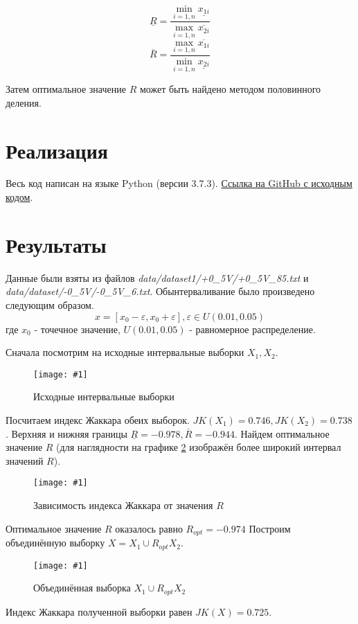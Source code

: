 \documentclass[a4paper,12pt]{article}
\newcommand{\plot}[3]{
    \begin{figure}[H]
        \begin{center}
            \texttt{[image: \#1]}
            \caption{#2}
            \label{#3}
        \end{center}
    \end{figure}
}
\begin{document}
    \begin{equation}
        \underline{R} = \frac{\min_{i=1,n}\underline{x_{1i}}}{\max_{i=1,n}\overline{x_{2i}}}
    \end{equation}
    \begin{equation}
        \overline{R} = \frac{\max_{i=1,n}\overline{x_{1i}}}{\min_{i=1,n}\underline{x_{2i}}}
    \end{equation}

    Затем оптимальное значение $ R $ может быть найдено методом половинного деления.

    \section{Реализация}
    \quad Весь код написан на языке Python (версии 3.7.3).
    \href{https://github.com/kirillkuks/Intervals/tree/master/lab1}{Ссылка на GitHub с исходным кодом}.

    \section{Результаты}
    \quad Данные были взяты из файлов \textsl{data/dataset1/+0\_5V/+0\_5V\_85.txt} и \textsl{data/dataset/-0\_5V/-0\_5V\_6.txt}.
    Обынтерваливание было произведено следующим образом.
    \begin{equation}
        x = [x_0 - \varepsilon, x_0 + \varepsilon], \varepsilon \in U(0.01, 0.05)
    \end{equation}
    где $ x_0 $ - точечное значение, $ U(0.01, 0.05) $ - равномерное распределение.
    
    Сначала посмотрим на исходные интервальные выборки $ X_1, X_2 $.
    \plot{X1X2}{Исходные интервальные выборки}{p:x1x2}

    Посчитаем индекс Жаккара обеих выборок. $ JK(X_1) = 0.746, JK(X_2) = 0.738 $.
    Верхняя и нижняя границы $ \underline{R} = -0.978, \overline{R} = -0.944 $.
    Найдем оптимальное значение $ R $
    (для наглядности на графике \ref{p:jaccard} изображён более широкий интервал значений $ R $).
  
    \plot{Jaccard}{Зависимость индекса Жаккара от значения $R$}{p:jaccard}

    Оптимальное значение $ R $ оказалось равно $ R_{opt} = -0.974 $
    Построим объединённую выборку $ X = X_1 \cup R_{opt} X_2 $.

    \plot{X1RX2}{Объединённая выборка $ X_1 \cup R_{opt} X_2 $}{p:x1rx2}

    Индекс Жаккара полученной выборки равен $ JK(X) = 0.725 $.
\end{document}
